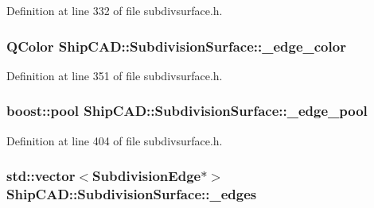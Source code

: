 Definition at line 332 of file subdivsurface.\-h.

\hypertarget{classShipCAD_1_1SubdivisionSurface_aced3b075062f92e55b3a89729cad3fd2}{
\subsubsection[{\-\_\-edge\-\_\-color}]{\setlength{\rightskip}{0pt plus 5cm}Q\-Color Ship\-C\-A\-D\-::\-Subdivision\-Surface\-::\-\_\-edge\-\_\-color\hspace{0.3cm}{\ttfamily [protected]}}}\label{classShipCAD_1_1SubdivisionSurface_aced3b075062f92e55b3a89729cad3fd2}


Definition at line 351 of file subdivsurface.\-h.

\hypertarget{classShipCAD_1_1SubdivisionSurface_a7a7e25c91a06ca2b3f3d27a5ca310f08}{
\subsubsection[{\-\_\-edge\-\_\-pool}]{\setlength{\rightskip}{0pt plus 5cm}boost\-::pool Ship\-C\-A\-D\-::\-Subdivision\-Surface\-::\-\_\-edge\-\_\-pool\hspace{0.3cm}{\ttfamily [protected]}}}\label{classShipCAD_1_1SubdivisionSurface_a7a7e25c91a06ca2b3f3d27a5ca310f08}


Definition at line 404 of file subdivsurface.\-h.

\hypertarget{classShipCAD_1_1SubdivisionSurface_a709c44779394f03c06c16adba6187ecd}{
\subsubsection[{\-\_\-edges}]{\setlength{\rightskip}{0pt plus 5cm}std\-::vector$<${\bf Subdivision\-Edge}$\ast$$>$ Ship\-C\-A\-D\-::\-Subdivision\-Surface\-::\-\_\-edges\hspace{0.3cm}{\ttfamily [protected]}}}\label{classShipCAD_1_1SubdivisionSurface_a709c44779394f03c06c16adba6187ecd}


